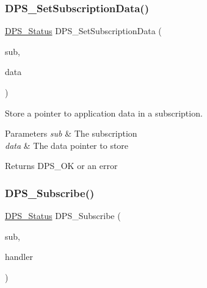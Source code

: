\subsubsection{\texorpdfstring{D\+P\+S\+\_\+\+Set\+Subscription\+Data()}{DPS\_SetSubscriptionData()}}
{\footnotesize\ttfamily \hyperlink{group__status_ga30395a84d3cad9d4ec29848106415038}{D\+P\+S\+\_\+\+Status} D\+P\+S\+\_\+\+Set\+Subscription\+Data (\begin{DoxyParamCaption}\item[{\hyperlink{group__subscription_gadb927c4c1b7306867a75fc4288b54af7}{D\+P\+S\+\_\+\+Subscription} $\ast$}]{sub,  }\item[{void $\ast$}]{data }\end{DoxyParamCaption})}



Store a pointer to application data in a subscription. 


\begin{DoxyParams}{Parameters}
{\em sub} & The subscription \\
\hline
{\em data} & The data pointer to store\\
\hline
\end{DoxyParams}
\begin{DoxyReturn}{Returns}
D\+P\+S\+\_\+\+OK or an error 
\end{DoxyReturn}
\mbox{\label{group__subscription_ga83234ea82a91e07e3f5894a4dcf5267e}} 
\subsubsection{\texorpdfstring{D\+P\+S\+\_\+\+Subscribe()}{DPS\_Subscribe()}}
{\footnotesize\ttfamily \hyperlink{group__status_ga30395a84d3cad9d4ec29848106415038}{D\+P\+S\+\_\+\+Status} D\+P\+S\+\_\+\+Subscribe (\begin{DoxyParamCaption}\item[{\hyperlink{group__subscription_gadb927c4c1b7306867a75fc4288b54af7}{D\+P\+S\+\_\+\+Subscription} $\ast$}]{sub,  }\item[{\hyperlink{group__subscription_gab95ef1762636ad505c940744b8dce83f}{D\+P\+S\+\_\+\+Publication\+Handler}}]{handler }\end{DoxyParamCaption})}



